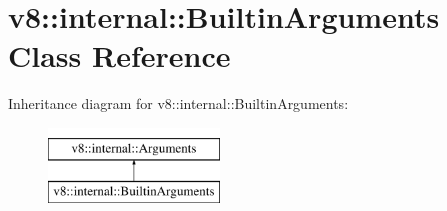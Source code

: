 \hypertarget{classv8_1_1internal_1_1BuiltinArguments}{}\section{v8\+:\+:internal\+:\+:Builtin\+Arguments Class Reference}
\label{classv8_1_1internal_1_1BuiltinArguments}
Inheritance diagram for v8\+:\+:internal\+:\+:Builtin\+Arguments\+:\begin{figure}[H]
\begin{center}
\leavevmode
\includegraphics[height=2.000000cm]{classv8_1_1internal_1_1BuiltinArguments}
\end{center}
\end{figure}
